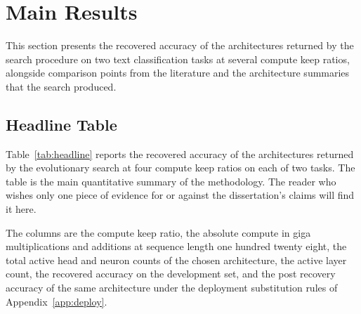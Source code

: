\section{Main Results}
\label{chap:results}

This section presents the recovered accuracy of the architectures returned by the search procedure on two text classification tasks at several compute keep ratios, alongside comparison points from the literature and the architecture summaries that the search produced.

\subsection{Headline Table}

Table~\ref{tab:headline} reports the recovered accuracy of the architectures returned by the evolutionary search at four compute keep ratios on each of two tasks. The table is the main quantitative summary of the methodology. The reader who wishes only one piece of evidence for or against the dissertation's claims will find it here.

The columns are the compute keep ratio, the absolute compute in giga multiplications and additions at sequence length one hundred twenty eight, the total active head and neuron counts of the chosen architecture, the active layer count, the recovered accuracy on the development set, and the post recovery accuracy of the same architecture under the deployment substitution rules of Appendix~\ref{app:deploy}.

